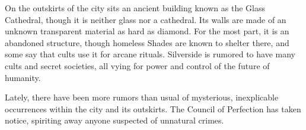 \documentclass[blue]{Silversiders}
\begin{document}
On the outskirts of the city sits an ancient building known as the Glass Cathedral, though it is neither glass nor a cathedral. Its walls are made of an unknown transparent material as hard as diamond. For the most part, it is an abandoned structure, though homeless Shades are known to shelter there, and some say that cults use it for arcane rituals. Silverside is rumored to have many cults and secret societies, all vying for power and control of the future of humanity.

Lately, there have been more rumors than usual of mysterious, inexplicable occurrences within the city and its outskirts. The Council of Perfection has taken notice, spiriting away anyone suspected of unnatural crimes.
\end{document}
